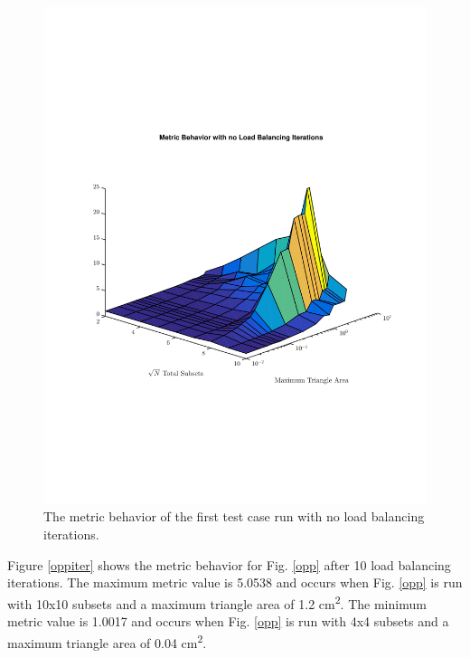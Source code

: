 \documentclass{anstrans}
\begin{document}
\begin{figure}[H]
\centering
\includegraphics[scale=0.5, trim = 0cm 8cm 0cm 7cm,clip]{figures/OppNoIter.pdf}
\caption{The metric behavior of the first test case run with no load balancing iterations.}
\label{oppnoiter}
\end{figure}

Figure \ref{oppiter} shows the metric behavior for Fig. \ref{opp} after 10 load balancing iterations. The maximum metric value is 5.0538 and occurs when Fig. \ref{opp} is run with 10x10 subsets and a maximum triangle area of 1.2 cm\textsuperscript{2}. The minimum metric value is 1.0017 and occurs when Fig. \ref{opp} is run with 4x4 subsets and a maximum triangle area of 0.04 cm\textsuperscript{2}.
\end{document}

